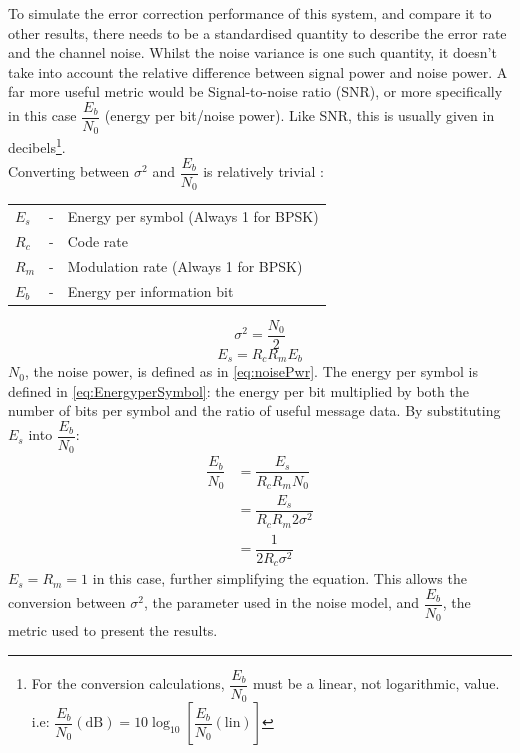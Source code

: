 \documentclass[11pt]{article}
\numberwithin{equation}{subsection}
\begin{document}
To simulate the error correction performance of this system, and compare it to other results, there needs to be a standardised quantity to describe the error rate and the channel noise. Whilst the noise variance is one such quantity, it doesn't take into account the relative difference between signal power and noise power. A far more useful metric would be Signal-to-noise ratio (SNR), or more specifically in this case $\dfrac{E_b}{N_0}$ (energy per bit/noise power). Like SNR, this is usually given in decibels\footnote{For the conversion calculations, $\dfrac{E_b}{N_0}$ must be a linear, not logarithmic, value. i.e: $\dfrac{E_b}{N_0}(\text{dB}) = 10\log_{10}\left[\dfrac{E_b}{N_0}(\text{lin})\right]$}. 
\vspace{3mm} \\
\noindent
Converting between $\sigma^2$ and $\dfrac{E_b}{N_0}$ is relatively trivial \cite{gilley2003bit}:
\vspace{3mm} \\
\noindent
\begin{tabular}{lcl}
$E_s$ & - & Energy per symbol (Always 1 for BPSK) \\
$R_c$ & - & Code rate \\
$R_m$ & - & Modulation rate (Always 1 for BPSK) \\
$E_b$ & - & Energy per information bit \\
\end{tabular}
\begin{equation} \label{eq:noisePwr}
\sigma^2 = \dfrac{N_0}{2}
\end{equation}
\begin{equation}\label{eq:EnergyperSymbol}
E_s = R_cR_mE_b
\end{equation}
$N_0$, the noise power, is defined as in \ref{eq:noisePwr}. The energy per symbol is defined in \ref{eq:EnergyperSymbol}: the energy per bit multiplied by both the number of bits per symbol and the ratio of useful message data. By substituting $E_s$ into $\dfrac{E_b}{N_0}$:
\begin{equation}
\begin{aligned}
\dfrac{E_b}{N_0} &= \dfrac{E_s}{R_cR_mN_0} \\
&= \dfrac{E_s}{R_cR_m2\sigma^2} \\
&= \dfrac{1}{2R_c\sigma^2}
\end{aligned}
\end{equation}
$E_s = R_m = 1$ in this case, further simplifying the equation. This allows the conversion between $\sigma^2$, the parameter used in the noise model, and $\dfrac{E_b}{N_0}$, the metric used to present the results.
\end{document}
